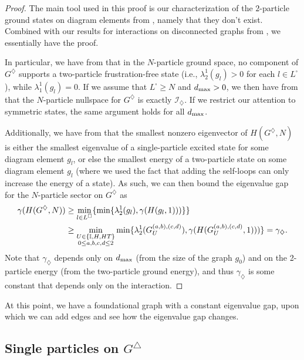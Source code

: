 \documentclass[../thesis-main/thesis-main]{subfiles}
\begin{document}
\begin{proof}
The main tool used in this proof is our characterization of the $2$-particle ground states on diagram elements from , namely that they don't exist.  Combined with our results for interactions on disconnected graphs from , we essentially have the proof.  

In particular, we have from  that in the $N$-particle ground space, no component of $G^{\diamondsuit}$ supports a two-particle frustration-free state (i.e., $\lambda_{2}^1(g_l)>0$ for each $l\in L^\square$), while $\lambda_1^1(g_l) = 0$.  If we assume that $L^\square \geq N$ and $d_{\text{max}} > 0$, we then have from  that the $N$-particle nullspace for $G^{\diamondsuit}$ is exactly $\mathcal{I}_\diamondsuit$.  If we restrict our attention to symmetric states, the same argument holds for all $d_{\text{max}}$.

Additionally, we have from  that the smallest nonzero eigenvector of $H(G^\diamondsuit,N)$ is either the smallest eigenvalue of a single-particle excited state for some diagram element $g_l$, or else the smallest energy of a two-particle state on some diagram element $g_l$ (where we used the fact that adding the self-loops can only increase the energy of a state).  As such, we can then bound the eigenvalue gap for the $N$-particle sector on $G^\diamondsuit$ as
\begin{align}
  \gamma(H(G^{\diamondsuit},N))&\geq \min_{l\in L^{\square}}\{ \min\{\lambda_{2}^{1}(g_{l}),\gamma(H(g_{l},1)))\}\} \\
    &\geq \min_{\substack{U\in\{\mathbb{I},H,HT\}\\0\leq a,b,c,d \leq 2}} \min\{\lambda_{2}^{1}(G_U^{(a,b),(c,d)}),\gamma(H(G_U^{(a,b),(c,d)},1)))\} =\gamma_{\diamondsuit}.
\end{align}
Note that $\gamma_{\diamondsuit}$ depends only on $d_{\text{max}}$ (from the size of the graph $g_0$) and on the 2-particle energy (from the two-particle ground energy), and thus $\gamma_\diamondsuit$ is some constant that depends only on the interaction.
\end{proof}

At this point, we have a foundational graph with a constant eigenvalue gap, upon which we can add edges and see how the eigenvalue gap changes.

\subsection{Single particles on $G^{\triangle}$}
\label{sec:The-gate-graph_G_triangle}
\end{document}
